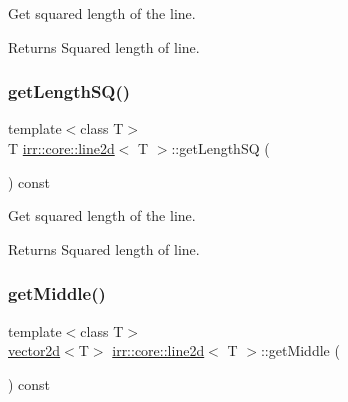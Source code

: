 Get squared length of the line. 

\begin{DoxyReturn}{Returns}
Squared length of line. 
\end{DoxyReturn}
\mbox{\label{classirr_1_1core_1_1line2d_ab2e1b51af84b3f134a32ebb0b7e6968f}} 
\subsubsection{\texorpdfstring{get\+Length\+S\+Q()}{getLengthSQ()}\hspace{0.1cm}{\footnotesize\ttfamily [2/2]}}
{\footnotesize\ttfamily template$<$class T$>$ \\
T \hyperlink{classirr_1_1core_1_1line2d}{irr\+::core\+::line2d}$<$ T $>$\+::get\+Length\+SQ (\begin{DoxyParamCaption}{ }\end{DoxyParamCaption}) const\hspace{0.3cm}{\ttfamily [inline]}}



Get squared length of the line. 

\begin{DoxyReturn}{Returns}
Squared length of line. 
\end{DoxyReturn}
\mbox{\label{classirr_1_1core_1_1line2d_a18c94540c89997e0a4acc96e08f6f4a0}} 
\subsubsection{\texorpdfstring{get\+Middle()}{getMiddle()}\hspace{0.1cm}{\footnotesize\ttfamily [1/2]}}
{\footnotesize\ttfamily template$<$class T$>$ \\
\hyperlink{classirr_1_1core_1_1vector2d}{vector2d}$<$T$>$ \hyperlink{classirr_1_1core_1_1line2d}{irr\+::core\+::line2d}$<$ T $>$\+::get\+Middle (\begin{DoxyParamCaption}{ }\end{DoxyParamCaption}) const\hspace{0.3cm}{\ttfamily [inline]}}



